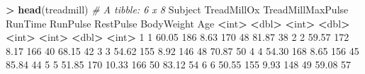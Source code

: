 \documentclass[]{book}
\newenvironment{Shaded}{\begin{snugshade}}{\end{snugshade}}
\newcommand{\CommentTok}[1]{\textcolor[rgb]{0.56,0.35,0.01}{\textit{#1}}}
\newcommand{\DecValTok}[1]{\textcolor[rgb]{0.00,0.00,0.81}{#1}}
\newcommand{\ErrorTok}[1]{\textcolor[rgb]{0.64,0.00,0.00}{\textbf{#1}}}
\newcommand{\FloatTok}[1]{\textcolor[rgb]{0.00,0.00,0.81}{#1}}
\newcommand{\KeywordTok}[1]{\textcolor[rgb]{0.13,0.29,0.53}{\textbf{#1}}}
\newcommand{\NormalTok}[1]{#1}
\newcommand{\OperatorTok}[1]{\textcolor[rgb]{0.81,0.36,0.00}{\textbf{#1}}}
\newcommand{\StringTok}[1]{\textcolor[rgb]{0.31,0.60,0.02}{#1}}
\renewenvironment{Shaded}{%
\setlength{\FrameRule}{1.5pt}
\def\FrameCommand{\fboxrule=\FrameRule\fboxsep=5pt 
                  \fcolorbox{framecolor}{shadecolor}}%
\MakeFramed {\FrameRestore}}%
{\endMakeFramed}
\begin{document}
\begin{Shaded}
\begin{Highlighting}[]
\OperatorTok{>}\StringTok{ }\KeywordTok{head}\NormalTok{(treadmill)}
\CommentTok{# A tibble: 6 x 8}
\NormalTok{  Subject TreadMillOx TreadMillMaxPulse RunTime RunPulse RestPulse BodyWeight   Age}
    \OperatorTok{<}\NormalTok{int}\OperatorTok{>}\StringTok{       }\ErrorTok{<}\NormalTok{dbl}\OperatorTok{>}\StringTok{             }\ErrorTok{<}\NormalTok{int}\OperatorTok{>}\StringTok{   }\ErrorTok{<}\NormalTok{dbl}\OperatorTok{>}\StringTok{    }\ErrorTok{<}\NormalTok{int}\OperatorTok{>}\StringTok{     }\ErrorTok{<}\NormalTok{int}\OperatorTok{>}\StringTok{      }\ErrorTok{<}\NormalTok{dbl}\OperatorTok{>}\StringTok{ }\ErrorTok{<}\NormalTok{int}\OperatorTok{>}
\DecValTok{1}       \DecValTok{1}       \FloatTok{60.05}               \DecValTok{186}    \FloatTok{8.63}      \DecValTok{170}        \DecValTok{48}      \FloatTok{81.87}    \DecValTok{38}
\DecValTok{2}       \DecValTok{2}       \FloatTok{59.57}               \DecValTok{172}    \FloatTok{8.17}      \DecValTok{166}        \DecValTok{40}      \FloatTok{68.15}    \DecValTok{42}
\DecValTok{3}       \DecValTok{3}       \FloatTok{54.62}               \DecValTok{155}    \FloatTok{8.92}      \DecValTok{146}        \DecValTok{48}      \FloatTok{70.87}    \DecValTok{50}
\DecValTok{4}       \DecValTok{4}       \FloatTok{54.30}               \DecValTok{168}    \FloatTok{8.65}      \DecValTok{156}        \DecValTok{45}      \FloatTok{85.84}    \DecValTok{44}
\DecValTok{5}       \DecValTok{5}       \FloatTok{51.85}               \DecValTok{170}   \FloatTok{10.33}      \DecValTok{166}        \DecValTok{50}      \FloatTok{83.12}    \DecValTok{54}
\DecValTok{6}       \DecValTok{6}       \FloatTok{50.55}               \DecValTok{155}    \FloatTok{9.93}      \DecValTok{148}        \DecValTok{49}      \FloatTok{59.08}    \DecValTok{57}


\end{Highlighting}
\end{Shaded}
\end{document}
